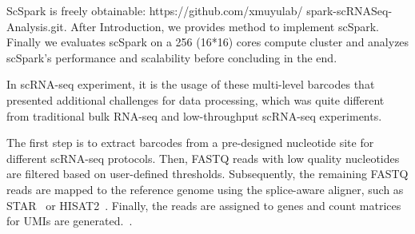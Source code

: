 \documentclass[conference]{IEEEtran}
\begin{document}
ScSpark is freely obtainable: https://github.com/xmuyulab/
spark-scRNASeq-Analysis.git.
After Introduction, we provides method to implement scSpark.
Finally we evaluates scSpark on a 256 (16*16) cores compute cluster and analyzes scSpark's performance and scalability before concluding in the end.


\iffalse

In scRNA-seq experiment, it is the usage of these multi-level barcodes that presented additional challenges for data processing, which was quite different from traditional bulk RNA-seq and low-throughput scRNA-seq experiments. 

The first step is to extract barcodes from a pre-designed nucleotide site for different scRNA-seq protocols. Then, FASTQ reads with low quality nucleotides are filtered based on user-defined thresholds. 
Subsequently, the remaining FASTQ reads are mapped to the reference genome using the splice-aware aligner, such as STAR~\cite{Dobin2013STAR} or HISAT2~\cite{Kim2015HISAT}. 
Finally, the reads are assigned to genes and count matrices for UMIs are generated.~\cite{Parekh2018zUMIs}. 

\end{document}
